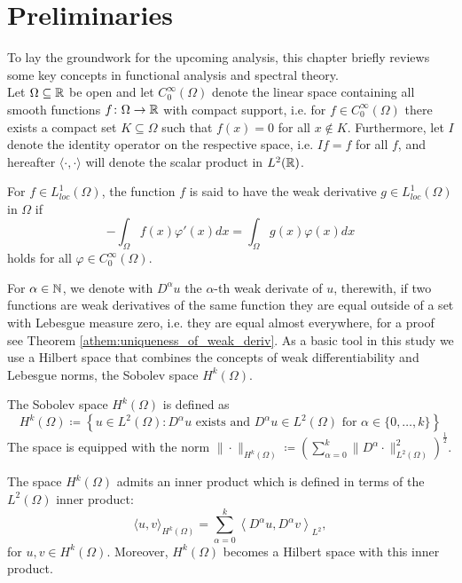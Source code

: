 \chapter{Preliminaries} \label{chap:2}

To lay the groundwork for the upcoming analysis, this chapter briefly reviews some key concepts in functional analysis and spectral theory.
~\\

Let $\Omega \subseteq \mathbb{R}$ be open and let $C_{0}^{\infty}(\Omega)$ denote the linear space containing all smooth functions $f \colon \Omega \rightarrow \mathbb{R}$ with compact support, i.e. for $f \in C_{0}^{\infty}(\Omega)$ there exists a compact set $K \subseteq \Omega$ such that $f(x) = 0$ for all $x \notin K$. Furthermore, let $I$ denote the identity operator on the respective space, i.e. $I f = f$ for all $f$, and hereafter $\langle \cdot, \cdot \rangle$ will denote the scalar product in $L^{2}(\mathbb{R})$.
\begin{definition}
For $f \in L^{1}_{loc}(\Omega)$, the function $f$ is said to have the weak derivative $g \in L^{1}_{loc}(\Omega)$ in $\Omega$ if
  \[ - \int_{\Omega} f(x) \varphi'(x) dx = \int_{\Omega} g(x) \varphi(x) dx \]
holds for all $\varphi \in C_{0}^{\infty}(\Omega)$.
\end{definition}
For $\alpha \in \mathbb{N}$, we denote with $D^{\alpha} u$ the $\alpha$-th weak derivate of $u$, therewith, if two functions are weak derivatives of the same function they are equal outside of a set with Lebesgue measure zero, i.e. they are equal almost everywhere, for a proof see Theorem \ref{athem:uniqueness_of_weak_deriv}. As a basic tool in this study we use a Hilbert space that combines the concepts of weak differentiability and Lebesgue norms, the Sobolev space $H^{k}(\Omega)$.

\begin{definition} The Sobolev space $H^{k}(\Omega)$ is defined as
\[ H^{k}(\Omega) \coloneqq \left\{ u \in L^{2}(\Omega) : D^{\alpha} u \text{ exists and } D^{\alpha} u \in L^{2}(\Omega) \text{ for } \alpha \in \{ 0, \dotsc, k \}\right\} \]
The space is equipped with the norm $\| \cdot \|_{H^{k}(\Omega)} \coloneqq \left( \sum_{\alpha = 0}^{k} \| D^{\alpha} \cdot \|_{L^{2}(\Omega)}^{2} \right)^{\frac{1}{2}}$.
\end{definition}	

The space $H^{k}(\Omega)$ admits an inner product which is defined in terms of the $L^{2}(\Omega)$ inner product:
	\[  \langle u,v \rangle_{H^{k}(\Omega)} = \sum_{\alpha=0}^{k} \left\langle D^{\alpha} u, D^{\alpha} v \right \rangle_{L^2}, \]
for $u, v \in H^{k}(\Omega)$. Moreover, $H^{k}(\Omega)$ becomes a Hilbert space with this inner product.

